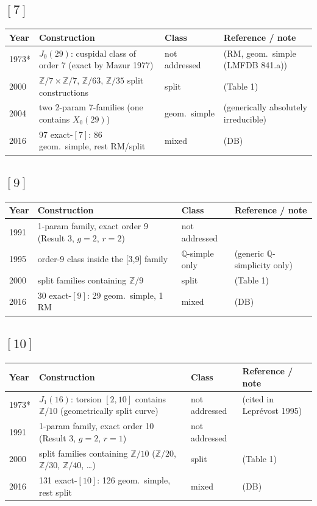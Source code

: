 \documentclass[10pt]{amsart}
\begin{document}
\subsection*{$[7]$}
\begin{longtable}{p{0.9cm} p{7.6cm} p{2.3cm} p{4.2cm}}
\hline Year & Construction & Class & Reference / note \\ \hline
1973* & $J_0(29)$: cuspidal class of order 7 (exact by Mazur 1977) & not addressed & \cite{Ogg1973} (RM, geom.\ simple (LMFDB 841.a))\\
2000 & $\mathbb{Z}/7\times\mathbb{Z}/7$, $\mathbb{Z}/63$, $\mathbb{Z}/35$ split constructions & split & \cite{HLP2000} (Table 1)\\
2004 & two 2-param 7-families (one contains $X_0(29)$) & geom.\ simple & \cite{LPS2004} (generically absolutely irreducible)\\
2016 & 97 exact-$[7]$: 86 geom.\ simple, rest RM/split & mixed & \cite{BSSVY} (DB)\\
\hline\end{longtable}
\subsection*{$[9]$}
\begin{longtable}{p{0.9cm} p{7.6cm} p{2.3cm} p{4.2cm}}
\hline Year & Construction & Class & Reference / note \\ \hline
1991 & 1-param family, exact order 9 (Result 3, $g{=}2$, $r{=}2$) & not addressed & \cite{Flynn1991}\\
1995 & order-9 class inside the [3,9] family & $\mathbb{Q}$-simple only & \cite{Leprevost1995} (generic $\mathbb{Q}$-simplicity only)\\
2000 & split families containing $\mathbb{Z}/9$ & split & \cite{HLP2000} (Table 1)\\
2016 & 30 exact-$[9]$: 29 geom.\ simple, 1 RM & mixed & \cite{BSSVY} (DB)\\
\hline\end{longtable}
\subsection*{$[10]$}
\begin{longtable}{p{0.9cm} p{7.6cm} p{2.3cm} p{4.2cm}}
\hline Year & Construction & Class & Reference / note \\ \hline
1973* & $J_1(16)$: torsion $[2,10]$ contains $\mathbb{Z}/10$ (geometrically split curve) & not addressed & \cite{Ogg1973} (cited in Lepr\'evost 1995)\\
1991 & 1-param family, exact order 10 (Result 3, $g{=}2$, $r{=}1$) & not addressed & \cite{Flynn1991}\\
2000 & split families containing $\mathbb{Z}/10$ ($\mathbb{Z}/20$, $\mathbb{Z}/30$, $\mathbb{Z}/40$, \dots) & split & \cite{HLP2000} (Table 1)\\
2016 & 131 exact-$[10]$: 126 geom.\ simple, rest split & mixed & \cite{BSSVY} (DB)\\
\hline\end{longtable}
\end{document}
